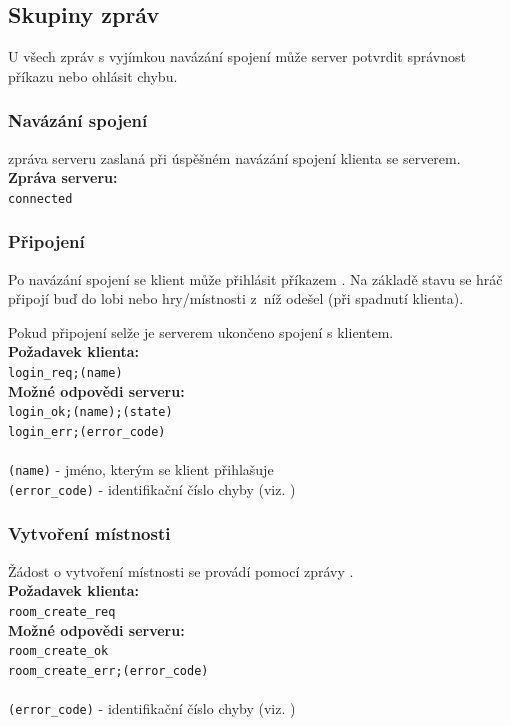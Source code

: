 \documentclass[12pt, a4paper]{article} %
\begin{document}
	\subsection{Skupiny zpráv}
	\par U všech zpráv s vyjímkou navázání spojení může server potvrdit správnost příkazu nebo ohlásit chybu.
	\subsubsection{Navázání spojení}
	\par {} zpráva serveru zaslaná při úspěšném navázání spojení klienta se serverem.\\
	\textbf{Zpráva serveru:}\\
	\texttt{connected}
	\subsubsection{Připojení}
	\par Po navázání spojení se klient může přihlásit příkazem . Na základě stavu se hráč připojí buď do lobi nebo hry/místnosti z níž odešel (při spadnutí klienta).
	\par Pokud připojení selže je serverem ukončeno spojení s klientem.\\
	\textbf{Požadavek klienta:}\\
	\texttt{login\_req;(name)}\\
	\textbf{Možné odpovědi serveru:}\\
	\texttt{login\_ok;(name);(state)}\\
	\texttt{login\_err;(error\_code)}\\\\
	\texttt{(name)} - jméno, kterým se klient přihlašuje\\
	\texttt{(error\_code)} - identifikační číslo chyby (viz. )
	\subsubsection{Vytvoření místnosti}
	\par Žádost o vytvoření místnosti se provádí pomocí zprávy .\\
	\textbf{Požadavek klienta:}\\
	\texttt{room\_create\_req}\\
	\textbf{Možné odpovědi serveru:}\\
	\texttt{room\_create\_ok}\\
	\texttt{room\_create\_err;(error\_code)}\\\\
	\texttt{(error\_code)} - identifikační číslo chyby (viz. )
\end{document}
